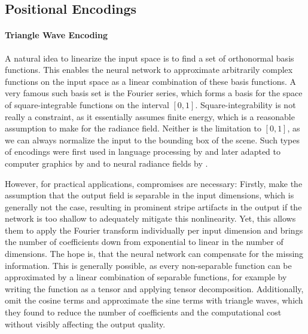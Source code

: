\subsection{Positional Encodings}

\paragraph{Triangle Wave Encoding}
A natural idea to linearize the input space is to find a set of orthonormal basis functions.
This enables the neural network to approximate arbitrarily complex functions on the input space as a linear combination of these basis functions.
A very famous such basis set is the Fourier series, which forms a basis for the space of square-integrable functions on the interval $[0, 1]$.
Square-integrability is not really a constraint, as it essentially assumes finite energy, which is a reasonable assumption to make for the radiance field.
Neither is the limitation to $[0, 1]$, as we can always normalize the input to the bounding box of the scene.
Such types of encodings were first used in language processing by \textcite{vaswani2017} and later adapted to computer graphics by \textcite{tancik2020} and to neural radiance fields by \textcite{mildenhall2020}.

However, for practical applications, compromises are necessary:
Firstly, \textcite{tancik2020} make the assumption that the output field is separable in the input dimensions, which is generally not the case, resulting in prominent stripe artifacts in the output if the network is too shallow to adequately mitigate this nonlinearity.
Yet, this allows them to apply the Fourier transform individually per input dimension and brings the number of coefficients down from exponential to linear in the number of dimensions.
The hope is, that the neural network can compensate for the missing information.
This is generally possible, as every non-separable function can be approximated by a linear combination of separable functions, for example by writing the function as a tensor and applying tensor decomposition.
Additionally, \textcite{muller2021} omit the cosine terms and approximate the sine terms with triangle waves, which they found to reduce the number of coefficients and the computational cost without visibly affecting the output quality.


